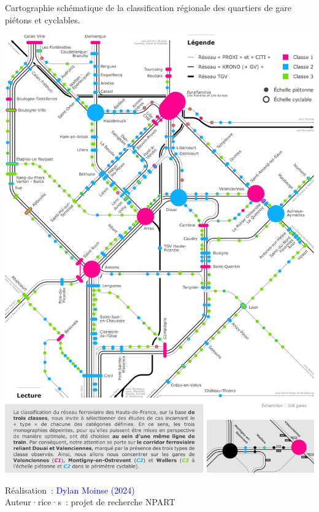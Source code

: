 \begin{refsegment}
    \begin{carte}[h!]\vspace*{4pt}
        \caption{Cartographie schématique de la classification régionale des quartiers de gare piétons et cyclables.}
        \label{fig-chap6:schema-reseau-train-hdf-classes}
        \centerline{\includegraphics[width=1\columnwidth]{src/Figures/Chap-7/FR_Carte_Reseau_classification.pdf}}
        \vspace{5pt}
        \begin{flushright}\scriptsize{
        Réalisation~: \textcolor{blue}{Dylan Moinse (2024)}
        \\
        Auteur·rice·s~: projet de recherche \acrshort{NPART}
        }\end{flushright}
    \end{carte}


\end{refsegment}
